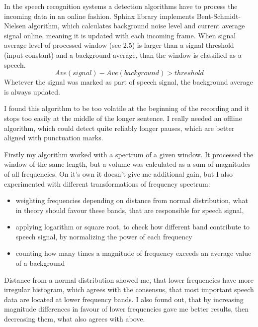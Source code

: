 \documentclass[12pt,a4paper,english]{article}
\begin{document}
In the speech recognition systems a detection algorithms have to process the incoming data in an online fashion. Sphinx library implements Bent-Schmidt-Nielsen algorithm, which calculates background noise level and current average signal online, meaning it is updated with each incoming frame. \newline
When signal average level of processed window (see 2.5) is larger than a signal threshold (input constant) and a background average, than the window is classified as a speech. \newline
\begin{equation}
    Ave(signal) - Ave(background) > threshold
\end{equation}
Whetever the signal was marked as part of speech signal, the background average is always updated.\newline


I found this algorithm to be too volatile at the beginning of the recording and it stops too easily at the middle of the longer sentence. I really needed an offline algorithm, which could detect quite reliably longer pauses, which are better aligned with punctuation marks. \newline

Firstly my algorithm worked with a spectrum of a given window. It processed the window of the same length, but a volume was calculated as a sum of magnitudes of all frequencies. On it's own it doesn't give me additional gain, but I also experimented with different transformations of frequency spectrum:
\begin{itemize}
    \item weighting frequencies depending on distance from normal distribution, what in theory should favour these bands, that are responsible for speech signal,
    \item applying logarithm or square root, to check how different band contribute to speech signal, by normalizing the power of each frequency
    \item counting how many times a magnitude of frequency exceeds an average value of a background
\end{itemize}


\newpage

Distance from a normal distribution showed me, that lower frequencies have more irregular histogram, which agrees with the consensus, that most important speech data are located at lower frequency bands. \newline 
I also found out, that by increasing magnitude differences in favour of lower frequencies gave me better results, then decreasing them, what also agrees with above. \newline
\end{document}
